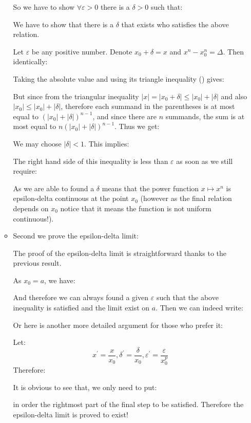 \begin{enumerate}
\begin{itemize}
			So we have to show $\forall \varepsilon>0$ there is a $\delta>0$ such that:
			
			We have to show that there is a $\delta$ that exists who satisfies the above relation.
			
			Let $\varepsilon$ be any positive number. Denote $x_0+\delta=x$ and $x^n-x_0^n=\Delta$. Then identically:
			
			Taking the absolute value and using its triangle inequality () gives:
			
			But since from the triangular inequality $|x|=\left|x_0+\delta\right| \leq \left|x_0\right|+|\delta|$ and also $\left|x_0\right| \leq \left|x_0\right|+|\delta|$, therefore each summand in the parentheses is at most equal to $\left(\left|x_0\right|+|\delta|\right)^{n-1}$, and since there are $n$ summands, the sum is at most equal to $n\left(\left|x_0\right|+|\delta|\right)^{n-1}$. Thus we get:
			
			We may choose $|\delta|<1$. This implies:
			
			The right hand side of this inequality is less than $\varepsilon$ as soon as we still require:
			
			As we are able to found a $\delta$ means that the power function $x \mapsto x^n$ is epsilon-delta continuous at the point $x_0$ (however as the final relation depends on $x_0$ notice that it means the function is not uniform continuous!).
			
			\item Second we prove the epsilon-delta limit:
			
			The proof of the epsilon-delta limit is straightforward thanks to the previous result.
			
			As $x_0=a$, we have:
			
			And therefore we can always found a given $\varepsilon$ such that the above inequality is satisfied and the limit exist on $a$. Then we can indeed write:
			
			Or here is another more detailed argument for those who prefer it:
			
			Let:
			$$x^{\prime}=\frac{x}{x_0}, \delta^{\prime}=\frac{\delta}{x_0}, \varepsilon^{\prime}=\frac{\varepsilon}{x_0^p}$$
			Therefore:
			
			It is obvious to see that, we only need to put:
			
			 in order the rightmost part of the final step to be satisfied. Therefore the epsilon-delta limit is proved to exist!
			

\end{itemize}
\end{enumerate}
